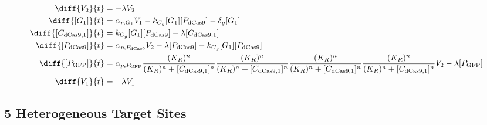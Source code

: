 \begin{align}
\diff{\constructGen{2}}{t} & = - \dilutionRate{}\constructGen{2}\\
\diff{\conc{\gRna{1}}}{t} & =  \txRate{\gRna{1}}\constructGen{1} - \gRnaBind{}\conc{\gRna{1}}\conc{\proSp{\cas{}}} - \rnaDegradeRate{}\conc{\gRna{1}}\\
\diff{\conc{\cplx{\cas}{1}}}{t} & =  \gRnaBind{}\conc{\gRna{1}}\conc{\proSp{\cas{}}} - \dilutionRate{}\conc{\cplx{\cas}{1}}\\
\diff{\conc{\proSp{\cas{}}}}{t} & =  \txtlRate{\proSp{\cas{}}}\constructGen{2} - \dilutionRate{}\conc{\proSp{\cas{}}} - \gRnaBind{}\conc{\gRna{1}}\conc{\proSp{\cas{}}}\\
\diff{\conc{\proSp{\gfp}}}{t} & =  \txtlRate{\proSp{\gfp}}\frac{(K_R)^n}{(K_R)^n + \conc{\cplx{\cas}{1}}^n}\frac{(K_R)^n}{(K_R)^n + \conc{\cplx{\cas}{1}}^n}\frac{(K_R)^n}{(K_R)^n + \conc{\cplx{\cas}{1}}^n}\frac{(K_R)^n}{(K_R)^n + \conc{\cplx{\cas}{1}}^n}\constructGen{2} - \dilutionRate{}\conc{\proSp{\gfp}}\\
\diff{\constructGen{1}}{t} & = - \dilutionRate{}\constructGen{1}
\end{align}

\subsection{5 Heterogeneous Target Sites}
\label{s:Multiplexed_5_gRNA_Repression}


